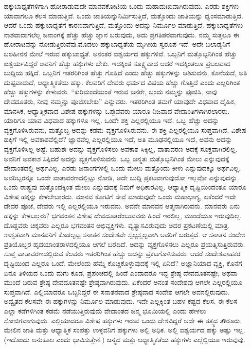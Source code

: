 ಹಕ್ಕುಬಾಧ್ಯತೆಗಳಿಗಾಗಿ ಹೋರಾಡುವುದೇ ಮಾನವಕೋಟಿಯ ಒಂದು ಮಹಾದುಃಖವಾಗಿರುವುದು. ಎರಡು ಶಕ್ತಿಗಳು ಯಾವಾಗಲೂ ಕೆಲಸ ಮಾಡುತ್ತಿವೆ. ಒಂದು ಜಾತಿಯನ್ನು\break ನಿರ್ಮಿಸುತ್ತಿದೆ, ಮತ್ತೊಂದು ಜಾತಿಯನ್ನು ಧ್ವಂಸಮಾಡುತ್ತಿದೆ. ಆದರೆ ಒಂದು ಹಕ್ಕುಬಾಧ್ಯತೆಗೆ ಕಾರಣವಾಗುತ್ತಿದೆ, ಮತ್ತೊಂದು ಅದನ್ನು ನಿರ್ಮೂಲ ಮಾಡುತ್ತಿದೆ. ಹಕ್ಕುಬಾಧ್ಯತೆಗಳು ನಾಶವಾದಾಗಲೆಲ್ಲ ಜನಾಂಗಕ್ಕೆ ಹೆಚ್ಚು ಹೆಚ್ಚು ಜ್ಞಾನ ಬರುವುದು, ಅದು ಪ್ರಗತಿಪರವಾಗುವುದು. ನಮ್ಮ ಸುತ್ತಲೂ ಈ ಹೋರಾಟವನ್ನು ನೋಡುತ್ತಿರುವೆವು.\break ಮೊದಲು ಹಕ್ಕುಬಾಧ್ಯತೆಯ ಮೃಗೀಯ ಸ್ವರೂಪ ಇದೆ. ಅದೇ ಬಲಾಡ್ಯನಿಗೆ ಬಲಹೀನನ ಮೇಲೆ ಇರುವ ಹಕ್ಕುಬಾಧ್ಯತೆ. ಅನಂತರ ಐಶ್ವರ್ಯದ ಹಕ್ಕುಗಳಿವೆ. ಒಬ್ಬನಿಗೆ ಮತ್ತೊಬ್ಬನಿಗಿಂತ ಹೆಚ್ಚು ಐಶ್ವರ್ಯವಿದ್ದರೆ ಅವನಿಗೆ ಹೆಚ್ಚು ಹಕ್ಕುಗಳು ಬೇಕು. ಇದಕ್ಕಿಂತ ಸೂಕ್ಷ್ಮವಾದ ಆದರೆ ಇದಕ್ಕಿಂತಲೂ ಪ್ರಬಲವಾದ ಬುದ್ದಿಯ ಹಕ್ಕಿದೆ. ಒಬ್ಬನಿಗೆ ಇತರರಿಗಿಂತ ಹೆಚ್ಚು ಗೊತ್ತಿದೆ ಎಂದು ಹೆಚ್ಚು ಹಕ್ಕುಗಳನ್ನು ಆಶಿಸುವನು. ಕೊನೆಯದೆ, ಅತಿ ದುಷ್ಟವಾದುದೆ, ಆಧ್ಯಾತ್ಮಿಕತೆಯ ಹಕ್ಕು. ಕೆಲವರಿಗೆ ದೇವರು ಧರ್ಮದ ವಿಷಯ ಹೆಚ್ಚು ಗೊತ್ತಿದೆ ಎಂದು ಎಲ್ಲರಿಗಿಂತ ಹೆಚ್ಚು ಹಕ್ಕುಗಳನ್ನು ಕೇಳುವರು. “ಕುರಿಮಂದೆಯಂತೆ ಇರುವ ಜನರೇ, ಬಂದು ನಮ್ಮನ್ನು ಪೂಜಿಸಿ, ನಾವು ದೇವದೂತರು, ನೀವು ನಮ್ಮನ್ನು ಪೂಜಿಸಬೇಕು” ಎನ್ನುವರು. ಇತರರಿಗಿಂತ ತಮಗೆ ಯಾವುದೇ ವಿಧವಾದ ದೈಹಿಕ, ಮಾನಸಿಕ, ಆಧ್ಯಾತ್ಮಿಕವಾದ ವಿಶೇಷ ಹಕ್ಕುಗಳನ್ನು ಒಪ್ಪುವವರು ಯಾರೂ ನಿಜವಾದ ವೇದಾಂತಿಗಳಾಗಿರಲಾರರು. ಯಾರಿಗೂ ಯಾವ ವಿಧವಾದ ಹಕ್ಕುಗಳೂ ಇಲ್ಲ. ಒಂದೇ ಶಕ್ತಿ ಎಲ್ಲರಲ್ಲಿಯೂ ಇದೆ. ಒಬ್ಬ ಹೆಚ್ಚು ಅದನ್ನು ವ್ಯಕ್ತಗೊಳಿಸಿರುವನು, ಮತ್ತೊಬ್ಬ ಅದನ್ನು ಕಡಮೆ ವ್ಯಕ್ತಗೊಳಿಸಿರುವನು. ಈ ಶಕ್ತಿ ಎಲ್ಲರಲ್ಲಿಯೂ ಸುಪ್ತವಾಗಿದೆ. ವಿಶೇಷ ಹಕ್ಕಿಗೆ ಇಲ್ಲಿ ಅವಕಾಶವೆಲ್ಲಿದೆ? ಜ್ಞಾನವೆಲ್ಲ ಎಲ್ಲರಲ್ಲಿಯೂ ಇದೆ, ಅತಿ ಮೂಢನಲ್ಲಿಯೂ ಇದೆ, ಅವನು ಅದನ್ನು ವ್ಯಕ್ತಗೊಳಿಸಿಲ್ಲ ಅಷ್ಟೆ. ಬಹುಶಃ ಅದನ್ನು ವ್ಯಕ್ತಗೊಳಿಸಲು ಅವಕಾಶ ಸಿಕ್ಕಿಲ್ಲ, ವಾತಾವರಣ ಅದಕ್ಕೆ ಸೂಕ್ತವಾಗಿರಲಿಲ್ಲ. ಅವನಿಗೆ ಅವಕಾಶ ಸಿಕ್ಕಿದರೆ ಅದನ್ನು ವ್ಯಕ್ತಗೊಳಿಸುವನು. ಒಬ್ಬ ಜನ್ಮತಃ ಮತ್ತೊಬ್ಬನಿಗಿಂತ ಮೇಲು ಎನ್ನುವುದಕ್ಕೆ ವೇದಾಂತದಲ್ಲಿ ಅರ್ಥವಿಲ್ಲ. ಎರಡು ಜನಾಂಗಗಳಲ್ಲಿ ಒಂದು ಮೇಲು ಮತ್ತೊಂದು ಕೀಳು ಎನ್ನುವುದಕ್ಕೂ ಅರ್ಥವಿಲ್ಲ. ಅವರಿಬ್ಬರನ್ನೂ ಒಂದೇ ವಾತಾವರಣದಲ್ಲಿಟ್ಟು ನೋಡಿ, ಅದೇ ಬುದ್ದಿ ಪ್ರಕಟವಾಗುವುದೋ ಇಲ್ಲವೋ ಎನ್ನುವುದನ್ನು. ಒಂದು ರಾಷ್ಟ್ರವು ಮತ್ತೊಂದಕ್ಕಿಂತ ಮೇಲು ಎನ್ನುವುದಕ್ಕೆ ನಿಮಗೆ ಅಧಿಕಾರವಿಲ್ಲ. ಆಧ್ಯಾತ್ಮಿಕ ದೃಷ್ಟಿಯಿಂದಂತೂ ಯಾರೂ ವಿಶೇಷ ಹಕ್ಕನ್ನು ಕೇಳಲೇಬಾರದು. ಮಾನವ ಕೋಟಿಗೆ ಸೇವೆ ಮಾಡುವುದೇ ಒಂದು ಮಹಾಭಾಗ್ಯ, ಏಕೆಂದರೆ ಇದೇ ದೇವರ ಪೂಜೆ, ದೇವರು ಇಲ್ಲಿ ಎಲ್ಲರಲ್ಲಿಯೂ ಇರುವನು. ಅವನೇ ಮಾನವನ ಆತ್ಮನಾಗಿರುವನು. ಮಾನವರು ಏನು ಹಕ್ಕನ್ನು ಕೇಳಬಲ್ಲರು? ಭಗವಂತನ ವಿಶೇಷ ದೇವದೂತರೆಂಬುವವರು ಹಿಂದೆ ಇರಲಿಲ್ಲ, ಮುಂದೆಯೂ ಇರುವುದಿಲ್ಲ. ದೊಡ್ಡವರು ಚಿಕ್ಕವರು ಎಲ್ಲರೂ ಭಗವಂತನ ಅಭಿವ್ಯಕ್ತಿಗಳು. ವ್ಯತ್ಯಾಸವಿರುವುದು ಅದರ ಪ್ರಕಟಣೆಯಲ್ಲಿ ಮಾತ್ರ. ಶಾಶ್ವತವಾಗಿ ಮಾನವನಿಗೆ ಕೊಡಲ್ಪಟ್ಟ ಸನಾತನ ಸಂದೇಶವೇ ಸ್ವಲ್ಪಸ್ವಲ್ಪವಾಗಿ ಅವರಿಗೆ ಬರುತ್ತದೆ. ಆ ಸನಾತನ ಸಂದೇಶ ಪ್ರತಿಯೊಬ್ಬರ ಹೃದಯಾಂತರಾಳದಲ್ಲಿಯೂ ಆಗಲೆ ಬರೆದಿದೆ. ಅದನ್ನು ವ್ಯಕ್ತಗೊಳಿಸಲು ಎಲ್ಲರೂ ಪ್ರಯತ್ನಿಸುತ್ತಿರುವರು. ಸೂಕ್ತ ವಾತಾವರಣದಲ್ಲಿರುವ ಕೆಲವರು ಇತರರಿಗಿಂತ ಹೆಚ್ಚು ಅದನ್ನು ಪ್ರಕಟಗೊಳಿಸುವರು. ಆದರೆ ಸಂದೇಶವಾಹಕರ ದೃಷ್ಟಿಯಿಂದ ಎಲ್ಲರೂ ಒಂದೆ. ಮೇಲೆಂದು ಹೆಮ್ಮೆ ಕೊಚ್ಚಿಕೊಳ್ಳುವುದಕ್ಕೆ ಇಲ್ಲಿ ಏನಿದೆ? ಅಜ್ಞಾನಿಯಾದ ವ್ಯಕ್ತಿ, ಕೊನೆಗೆ ಏನೂ ತಿಳಿಯದ ಒಂದು ಮಗು ಕೂಡ, ಪ್ರಪಂಚದಲ್ಲಿ ಹಿಂದೆ ಎಂದಾದರೂ ಇದ್ದ ಶ್ರೇಷ್ಠ ದೇವದೂತನಷ್ಟೇ, ಅಥವಾ ಮುಂದೆ ಬರುವ ಶ್ರೇಷ್ಠ ದೇವದೂತನಷ್ಟೇ ಶ್ರೇಷ್ಠವಾಗಿರುವುದು. ಏಕೆಂದರೆ ಅನಂತ ಸಂದೇಶವು ಆಗಲೇ ಎಲ್ಲರಲ್ಲಿಯೂ ಸುಪ್ತವಾಗಿದೆ. ಎಲ್ಲಿಯಾದರೂ ಒಬ್ಬನಿದ್ದರೆ ಈ ಸನಾತನವಾದ ಶ್ರೇಷ್ಠವಾದ ಸಂದೇಶ ಆಗಲೇ ಅವನಲ್ಲಿರುವುದು. ಅದ್ವೈತದ ಕೆಲಸವೇ ಈ ಹಕ್ಕುಗಳನ್ನು ನಿರ್ಮೂಲ ಮಾಡುವುದು. ಇದೇ ಎಲ್ಲಕ್ಕಿಂತ ಬಹಳ ಕಷ್ಟದ ಕೆಲಸ. ಈ ಕೆಲಸ ಎಲ್ಲಾ ಕಡೆಗಳಿಗಿಂತ ಕಡಮೆ ನಡೆಯುತ್ತಿರುವುದು ವೇದಾಂತದ ಜನ್ಮ ಭೂಮಿಯಲ್ಲಿ ಎಂದು ಹೇಳಲು ಸೋಜಿಗವಾಗುವುದು. ಎಲ್ಲಿಯಾದರೂ ವಿಶೇಷ ಹಕ್ಕುಗಳು ಇರುವ ಒಂದು ದೇಶವಿದ್ದರೆ ಅದೇ ಈ ತತ್ತ್ವದ ತೌರೂರು. ಮೇಲಿನ ಜಾತಿ ಮತ್ತು ಆಧ್ಯಾತ್ಮಿಕ ಸಂಪತ್ತು ಉಳ್ಳವನಿಗೆ ಹಕ್ಕುಗಳು ಅಲ್ಲಿ ಅಧಿಕ. ಅಲ್ಲಿ ಐಶ್ವರ್ಯದ ಹಕ್ಕು ಅಷ್ಟು ಇಲ್ಲ. (ಇದೊಂದು ಅನುಕೂಲ ಎಂದು ಭಾವಿಸುತ್ತೇನೆ.) ಜನ್ಮದ ಮತ್ತು ಆಧ್ಯಾತ್ಮಿಕತೆಯ ಹಕ್ಕುಗಳು ಎಲ್ಲೆಲ್ಲಿಯೂ ಇರುವುವು.

